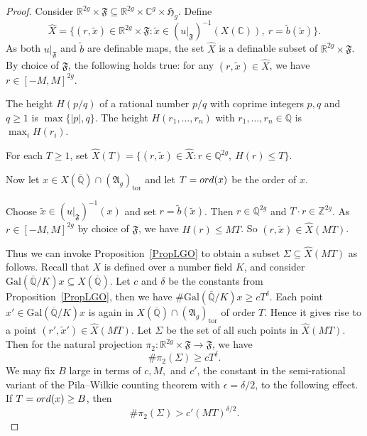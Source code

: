 \documentclass[12pt,oneside]{amsart}
\numberwithin{maincounter}{section}
\numberwithin{equation}{section}
\def\RR{\mathbb{R}}
\def\CC{\mathbb{C}}
\def\ZZ{\mathbb{Z}}
\def\QQ{\mathbb{Q}}
\newcommand{\IC}{{\CC}}
\newcommand{\IR}{{\RR}}
\newcommand{\IRanexp}{{{\RR}_{\rm an,exp}}}
\newcommand{\IQbar}{{\overline{\QQ}}}
\newcommand{\IZ}{{\ZZ}}
\newcommand{\IQ}{{\QQ}}
\newcommand{\ord}[1]{{\rm ord}({#1})}
\begin{document}
\begin{proof}
Consider $\IR^{2g} \times \mathfrak{F} \subseteq \IR^{2g} \times \IC^g \times \mathfrak{H}_g$. Define
\begin{equation}\label{EqDefnDefFamily}
\hat{X} = \{(r, \tilde{x}) \in \IR^{2g} \times \mathfrak{F} : \tilde{x} \in (u |_{\mathfrak{F}})^{-1}(X(\IC)), ~ r = \tilde{b}(\tilde{x})\}.
\end{equation}
As both $u|_{\mathfrak{F}}$ and $\tilde{b}$ are definable maps, the set $\hat{X}$ is a definable subset of $\IR^{2g} \times \mathfrak{F}$. By choice of $\mathfrak{F}$, the following holds true:  for any $(r,\tilde{x}) \in \hat{X}$, we have $r \in [-M,M]^{2g}$.

The height $H(p/q)$ of a rational number $p/q$ with coprime integers
$p,q$ and $q\ge 1$ is $\max\{|p|,q\}$. The height $H(r_1,\ldots,r_n)$
with $r_1,\ldots,r_n\in \IQ$ is $\max_i H(r_i)$. 

For each $T \ge 1$, set $\hat{X}(T) = \{(r,\tilde{x}) \in \hat{X} : r \in \IQ^{2g},~ H(r) \le T\}$. 

Now let $x \in X(\IQbar) \cap (\mathfrak{A}_g)_{\mathrm{tor}}$ and let
$T=\ord{x}$ be the order of $x$. 


Choose $\tilde{x} \in (u|_{\mathfrak{F}})^{-1}(x)$ and set $r = \tilde{b}(\tilde{x})$. Then $r \in \IQ^{2g}$ and $T\cdot r \in \IZ^{2g}$. As $r \in [-M,M]^{2g}$ by choice of $\mathfrak{F}$, we have $H(r) \le MT$. So $(r,\tilde{x}) \in \hat{X}(MT)$.


Thus we can invoke Proposition~\ref{PropLGO} to obtain a subset $\Sigma \subseteq \hat{X}(MT)$ as follows. Recall that $X$ is defined over a number field $K$, and consider $\mathrm{Gal}(\IQbar/K)x \subseteq X(\IQbar)$. Let $c$ and $\delta$ be the constants from Proposition~\ref{PropLGO}, then we have $\#\mathrm{Gal}(\IQbar/K)x \ge c T^{\delta}$. %
Each point $x' \in \mathrm{Gal}(\IQbar/K)x$ is again in $X(\IQbar)
\cap (\mathfrak{A}_g)_{\mathrm{tor}}$ of order $T$. Hence it gives rise to a point $(r',\tilde{x}') \in \hat{X}(MT)$. Let $\Sigma$ be the set of all such points in $\hat{X}(MT)$. Then for the natural projection $\pi_2 \colon \IR^{2g}\times \mathfrak{F} \rightarrow \mathfrak{F}$, we have
\begin{equation}
 \#\pi_2(\Sigma) \ge cT^{\delta}. %
\end{equation}
We may fix $B$ large in terms of $c,M,$ and $c'$, the constant in
the semi-rational variant of the Pila--Wilkie
counting theorem \cite[Cor.7.2]{HabeggerPilaENS} with $\epsilon =
\delta/2$, to the following effect.
If  $T = \ord{x}\ge B$, then
\begin{equation}
 \#\pi_2(\Sigma)  > c'(MT)^{\delta/2}.
\end{equation}


\end{proof}
\end{document}
